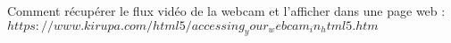 Comment récupérer le flux vidéo de la webcam et l'afficher dans une page web : 
$https://www.kirupa.com/html5/accessing_your_webcam_in_html5.htm$


